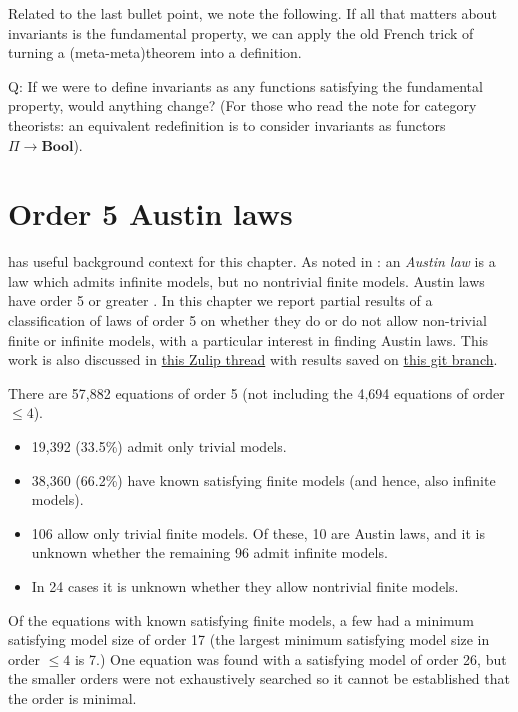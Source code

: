 Related to the last bullet point, we note the following. If all that matters about invariants is the fundamental property, we can apply the old French trick of turning a (meta-meta)theorem into a definition.

Q: If we were to define invariants as any functions satisfying the fundamental property, would anything change? (For those who read the note for category theorists: an equivalent redefinition is to consider invariants as functors $\Pi \to \textbf{Bool}$).


\chapter{Order 5 Austin laws}\label{order-5-austin-laws}

 has useful background context for this chapter.
As noted in : an \emph{Austin law} is a law which admits infinite models, but no nontrivial finite models. Austin laws have order 5 or greater \cite{Kisielewicz2}.
In this chapter we report partial results of a classification of laws of order 5 on whether they do or do not allow non-trivial finite or infinite models, with a particular interest in finding Austin laws.
This work is also discussed in \href{https://leanprover.zulipchat.com/#narrow/channel/458659-Equational/topic/Some.20results.20from.20order.205/near/482118667}{this Zulip thread} with results saved on \href{https://github.com/vlad902/equational_theories/tree/order5}{this git branch}.

There are 57,882 equations of order 5 (not including the 4,694 equations of order $\le 4$).
\begin{itemize}
  \item 19,392 (33.5\%) admit only trivial models.
  \item 38,360 (66.2\%) have known satisfying finite models (and hence, also infinite models).
  \item 106 allow only trivial finite models. Of these, 10 are Austin laws, and it is unknown whether the remaining 96 admit infinite models.
  \item In 24 cases it is unknown whether they allow nontrivial finite models.
\end{itemize}

Of the equations with known satisfying finite models, a few had a minimum satisfying model size of order 17 (the largest minimum satisfying model size in order $\le 4$ is 7.) One equation was found with a satisfying model of order 26, but the smaller orders were not exhaustively searched so it cannot be established that the order is minimal.

